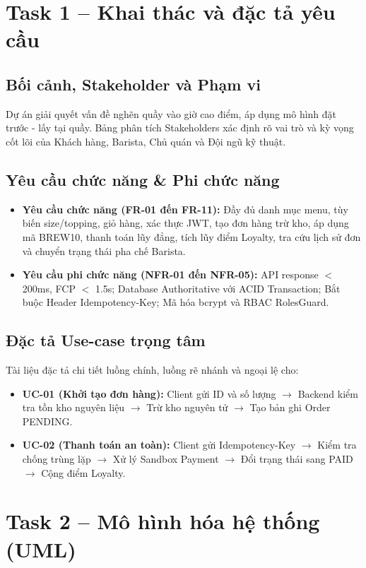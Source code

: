 \documentclass[a4paper]{article}
\begin{document}
\section{Task 1 – Khai thác và đặc tả yêu cầu}
\subsection{Bối cảnh, Stakeholder và Phạm vi}
Dự án giải quyết vấn đề nghẽn quầy vào giờ cao điểm, áp dụng mô hình đặt trước - lấy tại quầy. Bảng phân tích Stakeholders xác định rõ vai trò và kỳ vọng cốt lõi của Khách hàng, Barista, Chủ quán và Đội ngũ kỹ thuật.

\subsection{Yêu cầu chức năng \& Phi chức năng}
\begin{itemize}
    \item \textbf{Yêu cầu chức năng (FR-01 đến FR-11):} Đầy đủ danh mục menu, tùy biến size/topping, giỏ hàng, xác thực JWT, tạo đơn hàng trừ kho, áp dụng mã BREW10, thanh toán lũy đẳng, tích lũy điểm Loyalty, tra cứu lịch sử đơn và chuyển trạng thái pha chế Barista.
    \item \textbf{Yêu cầu phi chức năng (NFR-01 đến NFR-05):} API response $<$ 200ms, FCP $<$ 1.5s; Database Authoritative với ACID Transaction; Bắt buộc Header Idempotency-Key; Mã hóa bcrypt và RBAC RolesGuard.
\end{itemize}

\subsection{Đặc tả Use-case trọng tâm}
Tài liệu đặc tả chi tiết luồng chính, luồng rẽ nhánh và ngoại lệ cho:
\begin{itemize}
    \item \textbf{UC-01 (Khởi tạo đơn hàng):} Client gửi ID và số lượng $\rightarrow$ Backend kiểm tra tồn kho nguyên liệu $\rightarrow$ Trừ kho nguyên tử $\rightarrow$ Tạo bản ghi Order PENDING.
    \item \textbf{UC-02 (Thanh toán an toàn):} Client gửi Idempotency-Key $\rightarrow$ Kiểm tra chống trùng lặp $\rightarrow$ Xử lý Sandbox Payment $\rightarrow$ Đổi trạng thái sang PAID $\rightarrow$ Cộng điểm Loyalty.
\end{itemize}

\section{Task 2 – Mô hình hóa hệ thống (UML)}
\end{document}

